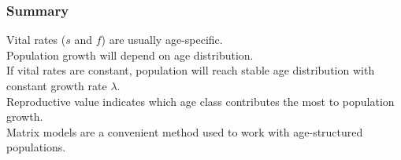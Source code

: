\documentclass[color=usenames,dvipsnames]{beamer}\usepackage[]{graphicx}\usepackage[]{color}
\begin{document}
\begin{frame}
  \frametitle{Summary}
  Vital rates ($s$ and $f$) are usually age-specific. \\
  \pause
  \vfill
  Population growth will depend on age distribution. \\
  \pause
  \vfill
  If vital rates are constant, population will reach stable
  age distribution with constant growth rate $\lambda$. \\
  \pause
  \vfill
  Reproductive value indicates which age class contributes the
  most to population growth. \\
  \pause
  \vfill
  Matrix models are a convenient method used to work with
  age-structured populations. \\
\end{frame}
\end{document}
